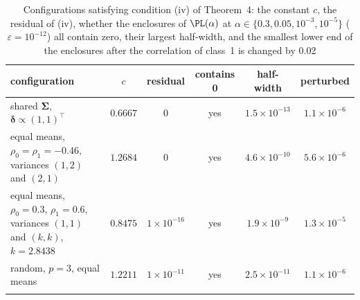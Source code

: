 \begin{table}[t]
\caption{Configurations satisfying condition (iv) of Theorem~4: the constant $c$, the residual of (iv), whether the enclosures of $\PL(\alpha)$ at $\alpha\in\{0.3,0.05,10^{-3},10^{-5}\}$ ($\varepsilon=10^{-12}$) all contain zero, their largest half-width, and the smallest lower end of the enclosures after the correlation of class~1 is changed by 0.02}\label{tab:zeroloss}
\footnotesize
\begin{tabular*}{\textwidth}{@{\extracolsep\fill}p{5.2cm}ccccc@{}}
\toprule
configuration & $c$ & residual & contains 0 & half-width & perturbed\\
\midrule
shared $\bm\Sigma$, $\bm\delta\propto(1,1)^\top$ & $0.6667$ & 0 & yes & $1.5\times10^{-13}$ & $1.1\times10^{-6}$\\
equal means, $\rho_0=\rho_1=-0.46$, variances $(1,2)$ and $(2,1)$ & $1.2684$ & 0 & yes & $4.6\times10^{-10}$ & $5.6\times10^{-6}$\\
equal means, $\rho_0=0.3$, $\rho_1=0.6$, variances $(1,1)$ and $(k,k)$, $k=2.8438$ & $0.8475$ & $1\times10^{-16}$ & yes & $1.9\times10^{-9}$ & $1.3\times10^{-5}$\\
random, $p=3$, equal means & $1.2211$ & $1\times10^{-11}$ & yes & $2.5\times10^{-11}$ & $1.1\times10^{-6}$\\
\botrule
\end{tabular*}
\end{table}
